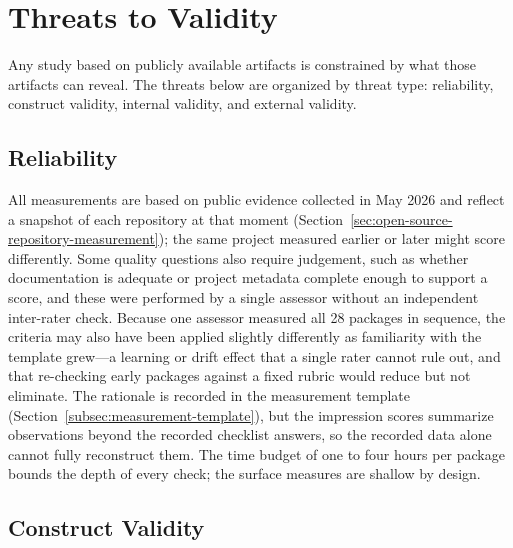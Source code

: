 \chapter{Threats to Validity}
\label{ch:threats-to-validity}

Any study based on publicly available artifacts is constrained by what those artifacts can reveal. The threats below are organized by threat type: reliability, construct validity, internal validity, and external validity.

\section{Reliability}
\label{sec:threat-reliability}

All measurements are based on public evidence collected in May 2026 and reflect a snapshot of each repository at that moment (Section~\ref{sec:open-source-repository-measurement}); the same project measured earlier or later might score differently. Some quality questions also require judgement, such as whether documentation is adequate or project metadata complete enough to support a score, and these were performed by a single assessor without an independent inter-rater check. Because one assessor measured all 28 packages in sequence, the criteria may also have been applied slightly differently as familiarity with the template grew---a learning or drift effect that a single rater cannot rule out, and that re-checking early packages against a fixed rubric would reduce but not eliminate. The rationale is recorded in the measurement template (Section~\ref{subsec:measurement-template}), but the impression scores summarize observations beyond the recorded checklist answers, so the recorded data alone cannot fully reconstruct them. The time budget of one to four hours per package bounds the depth of every check; the surface measures are shallow by design.

\section{Construct Validity}
\label{sec:threat-construct-validity}

